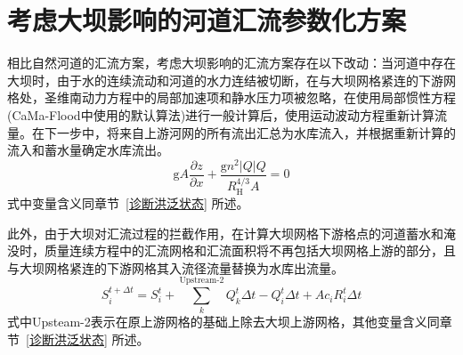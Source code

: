\section{考虑大坝影响的河道汇流参数化方案}
相比自然河道的汇流方案，考虑大坝影响的汇流方案存在以下改动：当河道中存在大坝时，由于水的连续流动和河道的水力连结被切断，在与大坝网格紧连的下游网格处，圣维南动力方程中的局部加速项和静水压力项被忽略，在使用局部惯性方程(CaMa-Flood中使用的默认算法)进行一般计算后，使用运动波动方程重新计算流量。在下一步中，将来自上游河网的所有流出汇总为水库流入，并根据重新计算的流入和蓄水量确定水库流出。
\begin{equation}
  {\mathrm g} A \frac{\partial z}{\partial x}+\frac{{\mathrm g} n^{2}|Q| Q}{R_{\mathrm{H}}^{4 / 3} A}=0
\end{equation}
式中变量含义同章节~\ref{诊断洪泛状态} 所述。


此外，由于大坝对汇流过程的拦截作用，在计算大坝网格下游格点的河道蓄水和淹没时，质量连续方程中的汇流网格和汇流面积将不再包括大坝网格上游的部分，且与大坝网格紧连的下游网格其入流径流量替换为水库出流量。
\begin{equation}
  S_{i}^{t+\Delta t}=S_{i}^{t}+\sum_{k}^\text{Upstream-2} Q_{k}^{t} \Delta t-Q_{i}^{t} \Delta t+A c_{i} R_{i}^{t} \Delta t
\end{equation}
式中Upsteam-2表示在原上游网格的基础上除去大坝上游网格，其他变量含义同章节~\ref{诊断洪泛状态} 所述。

